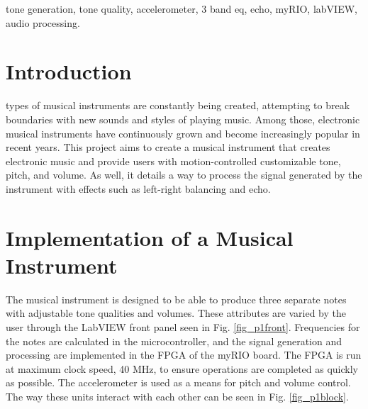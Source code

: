 \begin{IEEEkeywords}
tone generation, tone quality, accelerometer, 3 band eq, echo, myRIO, labVIEW, audio processing. 
\end{IEEEkeywords}

\IEEEpeerreviewmaketitle



\section{Introduction}
%
%
%
%
 types of musical instruments are constantly being created, attempting to break boundaries with new sounds and styles of playing music.
Among those, electronic musical instruments  have continuously grown and become increasingly popular in recent years.
This project aims to create a musical instrument that creates electronic music and provide users with motion-controlled customizable tone, pitch, and volume.
As well, it details a way to process the signal generated by the instrument with effects such as left-right balancing and echo.

\section{Implementation of a Musical Instrument}
The musical instrument is designed to be able to produce three separate notes with adjustable tone qualities and volumes.
 These attributes are varied by the user through the LabVIEW front panel seen in Fig. \ref{fig_p1front}.
 Frequencies for the notes are calculated in the microcontroller, and the signal generation and processing are implemented in the FPGA of the myRIO board.
 The FPGA is run at maximum clock speed, 40 MHz, to ensure operations are completed as quickly as possible.
 The accelerometer is used as a means for pitch and volume control.
 The way these units interact with each other can be seen in Fig. \ref{fig_p1block}.


